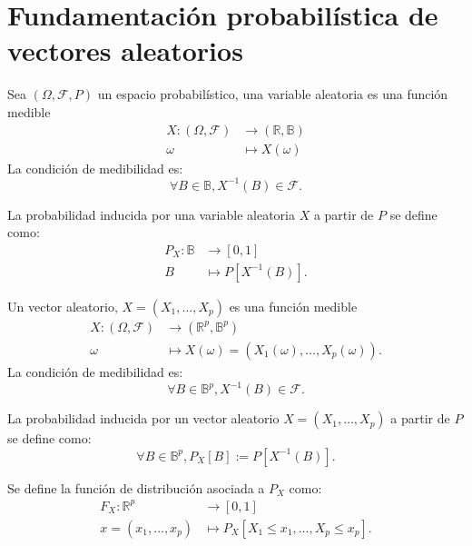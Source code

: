 \section{Fundamentación probabilística de vectores aleatorios}

\begin{ndef}
    Sea $(\Omega, \mathcal{F}, P)$ un espacio probabilístico, una variable aleatoria es una función medible
    \begin{align*}
    X:(\Omega, \mathcal{F}) &\rightarrow (\mathbb{R}, \mathbb{B})\\
    \omega &\mapsto X(\omega)
    \end{align*}
    La condición de medibilidad es:
    \[
    \forall B \in \mathbb{B}, X^{-1}(B) \in \mathcal{F}
    .\]
\end{ndef}

\begin{ndef}
    La probabilidad inducida por una variable aleatoria $X$ a partir de $P$ se define como:
    \begin{align*}
    P_{X}:\mathbb{B} &\rightarrow [0,1] \\
    B &\mapsto P[X^{-1}(B)].
    \end{align*}
\end{ndef}

\begin{ndef}
    Un vector aleatorio, $X = (X_1, \dots, X_p)$ es una función medible
    \begin{align*}
    X:(\Omega, \mathcal{F}) &\rightarrow (\mathbb{R}^p, \mathbb{B}^p) \\
    \omega &\mapsto X(\omega) = (X_1(\omega), \dots, X_p(\omega))
    .\end{align*}
    La condición de medibilidad es:
    \[
    \forall B \in \mathbb{B}^p, X^{-1}(B) \in \mathcal{F}
    .\]
\end{ndef}

\begin{ndef}
    La probabilidad inducida por un vector aleatorio $X = (X_1, \dots, X_p)$ a partir de $P$ se define como:
    \[
    \forall B \in \mathbb{B}^p, P_X[B] := P[X^{-1}(B)]
    .\]
\end{ndef}

\begin{ndef}
    Se define la función de distribución asociada a $P_X$ como:
    \begin{align*}
    F_X:\mathbb{R}^p &\rightarrow [0,1] \\
    x=(x_1,\dots,x_p) &\mapsto P_X[X_1 \leq x_1, \dots, X_p \leq x_p]
    .\end{align*}
\end{ndef}

